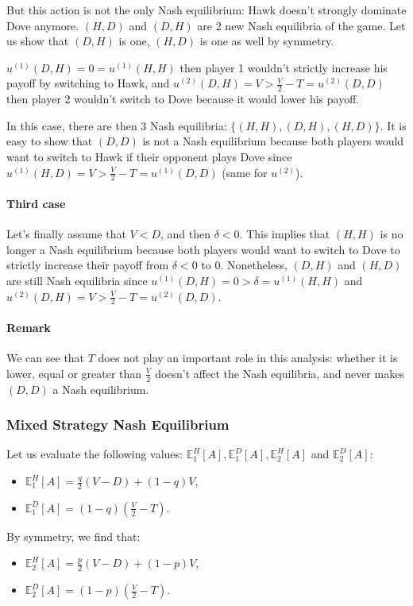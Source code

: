 \documentclass{article}
\newcommand{\E}{\mathbb E}
\begin{document}
But this action is not the only Nash equilibrium: Hawk doesn't strongly dominate Dove anymore.
$(H, D)$ and $(D, H)$ are 2 new Nash equilibria of the game. Let us show that $(D, H)$ is one,
$(H, D)$ is one as well by symmetry.

$u^{(1)}(D, H) = 0 = u^{(1)}(H, H)$  then player 1 wouldn't strictly increase his payoff by switching to Hawk, and
$u^{(2)}(D, H) = V > \frac V2 - T = u^{(2)}(D, D)$ then player 2 wouldn't switch to Dove because it would lower
his payoff.

In this case, there are then 3 Nash equilibria: $\{(H, H), (D, H), (H, D)\}$. It is easy to show that $(D, D)$
is not a Nash equilibrium because both players would want to switch to Hawk if their opponent plays Dove since
$u^{(1)}(H, D) = V > \frac V2-T = u^{(1)}(D, D)$ (same for $u^{(2)}$).

\paragraph{Third case} Let's finally assume that $V < D$, and then $\delta < 0$. This implies that $(H, H)$
is no longer a Nash equilibrium because both players would want to switch to Dove to strictly increase
their payoff from $\delta < 0$ to $0$. Nonetheless, $(D, H)$ and $(H, D)$ are still Nash equilibria
since $u^{(1)}(D, H) = 0 > \delta = u^{(1)}(H, H)$ and $u^{(2)}(D, H) = V > \frac V2 - T = u^{(2)}(D, D)$.

\paragraph{Remark} We can see that $T$ does not play an important role in this analysis: whether it is
lower, equal or greater than $\frac V2$ doesn't affect the Nash equilibria, and never makes $(D, D)$
a Nash equilibrium.

\subsubsection{Mixed Strategy Nash Equilibrium}
Let us evaluate the following values: $\E_1^H[A], \E_1^D[A], \E_2^H[A]$ and $\E_2^D[A]$:
\begin{itemize}
	\item $\E_1^H[A] = \frac q2(V-D) + (1-q)V$,
	\item $\E_1^D[A] = (1-q)\left(\frac V2 - T\right)$.
\end{itemize}

By symmetry, we find that:
\begin{itemize}
	\item $\E_2^H[A] = \frac p2(V-D) + (1-p)V$,
	\item $\E_2^D[A] = (1-p)\left(\frac V2 - T\right)$.
\end{itemize}
\end{document}
